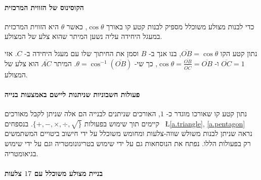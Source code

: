 \documentclass[11pt,a4paper]{article}
\newcommand*{\disfrac}[2]{\displaystyle\frac{#1}{#2}}
\begin{document}
\paragraph{הקוסינוס של הזווית המרכזית}
כדי לבנות מצולע משוכלל מספיק לבנות קטע קו באורך 
$\cos \theta$,
כאשר
$\theta$ 
היא הזווית המרכזית במעגל היחידה עליה נשען המיתר שהוא צלע של המצולע.
\begin{center}
\end{center}
נתון קטע הקו
$\overline{OB}=\cos\theta$,
בנו אנך ב-%
$B$
וסמן את החיתוך שלו עם מעגל היחידה ב-%
$C$.
אזי
$\overline{OC}=1$
ו-%
$\cos \theta=\disfrac{\overline{OB}}{\overline{OC}}=\overline{OB}$,
כך שי-%
$\theta = \cos^{-1} (\overline{OB})$.
המיתר 
$\overline{AC}$
הוא צלע של המצולע.

\paragraph{פעולות חשבוניות שניתנות ליישם באמצעות בנייה}

נתון קטע קו שאורכו מוגדר כ-%
$1$,
האורכים שניתנים לבנייה הם אלה שניתן לקבל מאורכים קיימים תוך שימוש בפעולות 
$\{+,-,\times,\div,\surd\}$.
בנספחים%
~\L{\ref{a.triangle}, \ref{a.pentagon}}
נראה שניתן לבנות משולש שווה-צלעות ומחומש משוכלל על ידי חישוב ביטויים המשתמשים רק בפעולות הללו. נפתח את הנוסחאות גם על ידי שימוש בטריגונומטריה וגם על ידי שימוש בגיאומטריה.

\paragraph{בניית מצולע משוכלל עם 
$17$
צלעות}
\end{document}

